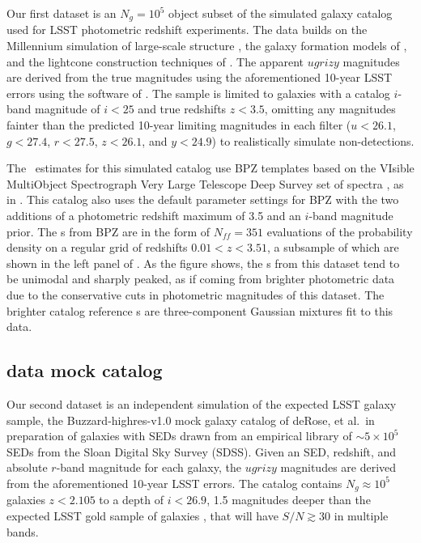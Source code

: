 Our first dataset is an $N_{g} = 10^{5}$ object subset of the 
\citet{graham_photometric_2017} simulated galaxy catalog used for LSST 
photometric redshift experiments.
The data builds on the Millennium simulation of large-scale structure 
\citep{springel_simulations_2005}, the galaxy formation models of 
\citet{gonzalez-perez_how_2014}, and the lightcone construction techniques of 
\citet{merson_lightcone_2013}.
The apparent $ugrizy$ magnitudes are derived from the true magnitudes using the 
aforementioned 10-year LSST errors using the software of 
\citet{connolly_end--end_2014}.
The sample is limited to galaxies with a catalog $i$-band magnitude of $i<25$ 
and true redshifts $z<3.5$, omitting any magnitudes fainter than the predicted 
10-year limiting magnitudes in each filter ($u<26.1$, $g<27.4$, $r<27.5$, 
$z<26.1$, and $y<24.9$) to realistically simulate non-detections.

The \pz\ estimates for this simulated catalog use BPZ templates based on the 
VIsible MultiObject Spectrograph Very Large Telescope Deep Survey set of 
spectra \citep{fevre_vimos_2005}, as in \citet{ilbert_accurate_2006}.
This catalog also uses the default parameter settings for BPZ with the two 
additions of a photometric redshift maximum of 3.5 and an $i$-band magnitude 
prior.
The \pz s from BPZ are in the form of $N_{ff} = 351$ evaluations of the 
probability density on a regular grid of redshifts $0.01 < z < 3.51$, a 
subsample of which are shown in the left panel of .
As the figure shows, the \pz s from this dataset tend to be unimodal and 
sharply peaked, as if coming from brighter photometric data due to the 
conservative cuts in photometric magnitudes of this dataset.
The brighter catalog reference \pz s are three-component Gaussian mixtures fit 
to this data.

\subsection{\Ssdata data mock catalog}

Our second dataset is an independent simulation of the expected LSST galaxy 
sample, the Buzzard-highres-v1.0 mock galaxy catalog of deRose, et al.\ in 
preparation of galaxies with SEDs drawn from an empirical library of 
$\sim5\times10^{5}$ SEDs from the Sloan Digital Sky Survey (SDSS).
Given an SED, redshift, and absolute $r$-band magnitude for each galaxy, the 
$ugrizy$ magnitudes are derived from the aforementioned 10-year LSST errors.
The catalog contains $N_{g} \approx 10^{5}$ galaxies $z<2.105$ to a depth of 
$i<26.9$, 1.5 magnitudes deeper than the expected LSST gold sample of galaxies 
\citep{ScienceBook}, that will have $S/N \gtrsim 30$ in multiple bands.

